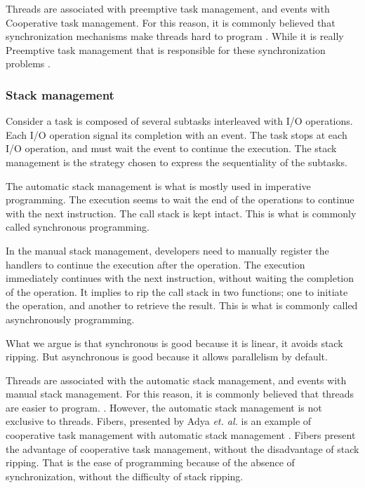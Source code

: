 Threads are associated with preemptive task management, and events with Cooperative task management.
For this reason, it is commonly believed that synchronization mechanisms make threads hard to program \cite{Ousterhout1996}.
While it is really Preemptive task management that is responsible for these synchronization problems \cite{Adya2002}.

\subsubsection{Stack management}

Consider a task is composed of several subtasks interleaved with I/O operations.
Each I/O operation signal its completion with an event.
The task stops at each I/O operation, and must wait the event to continue the execution.
The stack management is the strategy chosen to express the sequentiality of the subtasks.

The automatic stack management is what is mostly used in imperative programming.
The execution seems to wait the end of the operations to continue with the next instruction.
The call stack is kept intact.
This is what is commonly called synchronous programming.

In the manual stack management, developers need to manually register the handlers to continue the execution after the operation.
The execution immediately continues with the next instruction, without waiting the completion of the operation.
It implies to rip the call stack in two functions; one to initiate the operation, and another to retrieve the result.
This is what is commonly called asynchronously programming.


What we argue is that synchronous is good because it is linear, it avoids stack ripping.
But asynchronous is good because it allows parallelism by default.




Threads are associated with the automatic stack management, and events with manual stack management.
For this reason, it is commonly believed that threads are easier to program.
\cite{Thread systems allow programmers to express control flow and encapsulate state in a more natural manner} \cite{Behren2003}.
However, the automatic stack management is not exclusive to threads.
Fibers, presented by Adya \textit{et. al.} is an example of cooperative task management with automatic stack management \cite{Adya2002} .
Fibers present the advantage of cooperative task management, without the disadvantage of stack ripping.
That is the ease of programming because of the absence of synchronization, without the difficulty of stack ripping.

